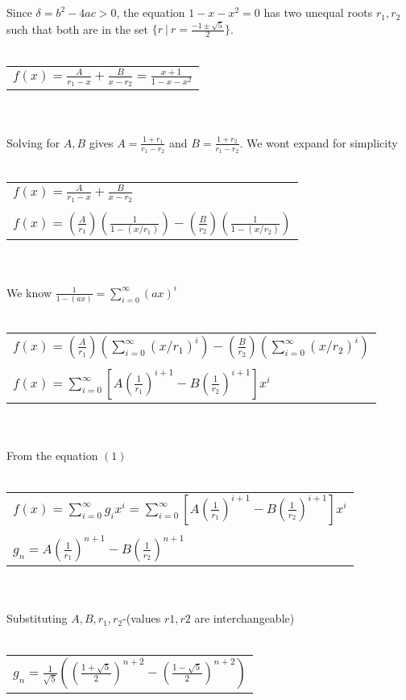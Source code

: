 \documentclass[12pt]{article}
\begin{document}
\\ \\
Since $\delta=b^2-4ac>0$, the equation $1-x-x^2=0$ has two unequal roots $r_1, r_2$ such that both 
are in the set $\{r\ |\ r=\frac{-1\pm \sqrt{5}}{2}  \}$.
\\ \\
\begin{tabular}{l}
    $f(x)=\frac{A}{r_1-x}+\frac{B}{x-r_2}=\frac{x+1}{1-x-x^2}$\\
\end{tabular}
\\ \\
Solving for $A, B$ gives $A=\frac{1+r_1}{r_1-r_2}$ and $B=\frac{1+r_2}{r_1-r_2}$. We wont expand 
for simplicity
\\ \\
\begin{tabular}{l}
    $f(x)=\frac{A}{r_1-x}+\frac{B}{x-r_2}$\\
    \\
    $f(x)=(\frac{A}{r_1})(\frac{1}{1-(x/r_1)})-(\frac{B}{r_2})(\frac{1}{1-(x/r_2)})$\\
\end{tabular}
\\ \\
We know $\frac{1}{1-(ax)}=\sum_{i=0}^{\infty}(ax)^i$
\\ \\
\begin{tabular}{l}
    $f(x)=(\frac{A}{r_1})(\sum_{i=0}^{\infty}(x/r_1)^i)-(\frac{B}{r_2})(\sum_{i=0}^{\infty}(x/r_2)^i)$\\
    \\
    $f(x)=\sum_{i=0}^{\infty}[A(\frac{1}{r_1})^{i+1}-B(\frac{1}{r_2})^{i+1}]x^i$\\
\end{tabular}
\\ \\
From the equation $(1)$
\\ \\
\begin{tabular}{l}
    $f(x)=\sum_{i=0}^{\infty}g_ix^i=\sum_{i=0}^{\infty}[A(\frac{1}{r_1})^{i+1}-B(\frac{1}{r_2})^{i+1}]x^i$\\
    \\
    $g_n=A(\frac{1}{r_1})^{n+1}-B(\frac{1}{r_2})^{n+1}$
\end{tabular}
\\ \\
Substituting $A, B, r_1, r_2$-(values $r1, r2$ are interchangeable)
\\ \\
\begin{tabular}{l}
    $g_n=\frac{1}{\sqrt{5}}((\frac{1+\sqrt{5}}{2})^{n+2}-(\frac{1-\sqrt{5}}{2})^{n+2})$
\end{tabular}
\end{document}
